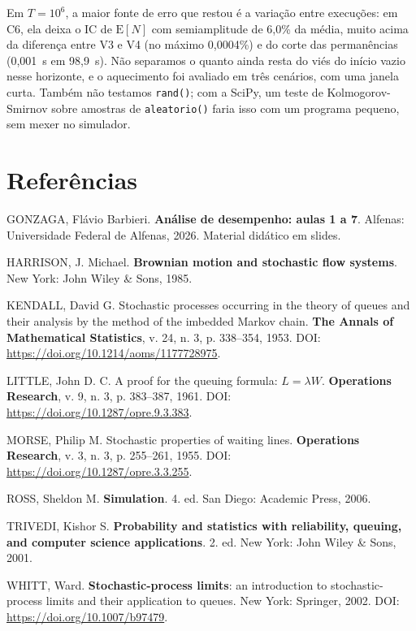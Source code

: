 \documentclass[
  article,      %
  10pt,         %
  oneside,
  a4paper,
  twocolumn,    %
  english,
  brazil        %
]{abntex2}
\newcommand{\EN}{\mathrm{E}[N]}
\begin{document}
Em $T=10^6$, a maior fonte de erro que restou é a variação entre execuções: em C6, ela deixa o IC de $\EN$ com semiamplitude de 6,0\% da média, muito acima da diferença entre V3 e V4 (no máximo 0,0004\%) e do corte das permanências (0,001~s em 98,9~s). Não separamos o quanto ainda resta do viés do início vazio nesse horizonte, e o aquecimento foi avaliado em três cenários, com uma janela curta. Também não testamos \texttt{rand()}; com a SciPy, um teste de Kolmogorov-Smirnov sobre amostras de \texttt{aleatorio()} faria isso com um programa pequeno, sem mexer no simulador.


\section*{Referências}

\begin{SingleSpace}
\raggedright
\noindent
GONZAGA, Flávio Barbieri. \textbf{Análise de desempenho: aulas 1 a 7}.
Alfenas: Universidade Federal de Alfenas, 2026. Material didático em slides.

\vspace{0.4em}
\noindent
HARRISON, J. Michael. \textbf{Brownian motion and stochastic flow systems}.
New York: John Wiley \& Sons, 1985.

\vspace{0.4em}
\noindent
KENDALL, David G. Stochastic processes occurring in the theory of queues and
their analysis by the method of the imbedded Markov chain. \textbf{The Annals
of Mathematical Statistics}, v. 24, n. 3, p. 338--354, 1953. DOI:
\url{https://doi.org/10.1214/aoms/1177728975}.

\vspace{0.4em}
\noindent
LITTLE, John D. C. A proof for the queuing formula: $L=\lambda W$.
\textbf{Operations Research}, v. 9, n. 3, p. 383--387, 1961. DOI:
\url{https://doi.org/10.1287/opre.9.3.383}.

\vspace{0.4em}
\noindent
MORSE, Philip M. Stochastic properties of waiting lines.
\textbf{Operations Research}, v. 3, n. 3, p. 255--261, 1955. DOI:
\url{https://doi.org/10.1287/opre.3.3.255}.

\vspace{0.4em}
\noindent
ROSS, Sheldon M. \textbf{Simulation}. 4. ed. San Diego: Academic Press, 2006.

\vspace{0.4em}
\noindent
TRIVEDI, Kishor S. \textbf{Probability and statistics with reliability,
queuing, and computer science applications}. 2. ed. New York: John Wiley
\& Sons, 2001.

\vspace{0.4em}
\noindent
WHITT, Ward. \textbf{Stochastic-process limits}: an introduction to
stochastic-process limits and their application to queues. New York:
Springer, 2002. DOI: \url{https://doi.org/10.1007/b97479}.
\end{SingleSpace}
\end{document}
